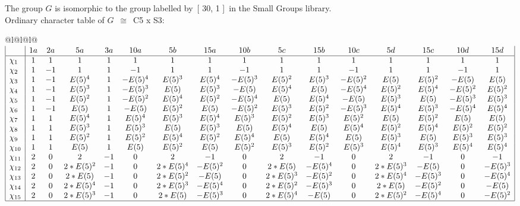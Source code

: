 \documentclass[varwidth=\maxdimen,border=10]{standalone}
\begin{document}
The group $G$ is isomorphic to the group labelled by\ [ 30, 1 ]\ in the Small Groups library.\\
Ordinary character table of $G$\ $\cong$\ C5 x S3:\\
\begin{center}
\begin{tabular}{@{}l@{}l@{}l@{}}
\hline
\(\begin{array}{|l|ccccccccccccccc|}
  & 1a & 2a & 5a & 3a & 10a & 5b & 15a & 10b & 5c & 15b & 10c & 5d & 15c & 10d & 15d\\ \hline
\chi_{1} & 1 & 1 & 1 & 1 & 1 & 1 & 1 & 1 & 1 & 1 & 1 & 1 & 1 & 1 & 1\\
\chi_{2} & 1 & -1 & 1 & 1 & -1 & 1 & 1 & -1 & 1 & 1 & -1 & 1 & 1 & -1 & 1\\
\chi_{3} & 1 & -1 & E(5)^{4} & 1 & -E(5)^{4} & E(5)^{3} & E(5)^{4} & -E(5)^{3} & E(5)^{2} & E(5)^{3} & -E(5)^{2} & E(5) & E(5)^{2} & -E(5) & E(5)\\
\chi_{4} & 1 & -1 & E(5)^{3} & 1 & -E(5)^{3} & E(5) & E(5)^{3} & -E(5) & E(5)^{4} & E(5) & -E(5)^{4} & E(5)^{2} & E(5)^{4} & -E(5)^{2} & E(5)^{2}\\
\chi_{5} & 1 & -1 & E(5)^{2} & 1 & -E(5)^{2} & E(5)^{4} & E(5)^{2} & -E(5)^{4} & E(5) & E(5)^{4} & -E(5) & E(5)^{3} & E(5) & -E(5)^{3} & E(5)^{3}\\
\chi_{6} & 1 & -1 & E(5) & 1 & -E(5) & E(5)^{2} & E(5) & -E(5)^{2} & E(5)^{3} & E(5)^{2} & -E(5)^{3} & E(5)^{4} & E(5)^{3} & -E(5)^{4} & E(5)^{4}\\
\chi_{7} & 1 & 1 & E(5)^{4} & 1 & E(5)^{4} & E(5)^{3} & E(5)^{4} & E(5)^{3} & E(5)^{2} & E(5)^{3} & E(5)^{2} & E(5) & E(5)^{2} & E(5) & E(5)\\
\chi_{8} & 1 & 1 & E(5)^{3} & 1 & E(5)^{3} & E(5) & E(5)^{3} & E(5) & E(5)^{4} & E(5) & E(5)^{4} & E(5)^{2} & E(5)^{4} & E(5)^{2} & E(5)^{2}\\
\chi_{9} & 1 & 1 & E(5)^{2} & 1 & E(5)^{2} & E(5)^{4} & E(5)^{2} & E(5)^{4} & E(5) & E(5)^{4} & E(5) & E(5)^{3} & E(5) & E(5)^{3} & E(5)^{3}\\
\chi_{10} & 1 & 1 & E(5) & 1 & E(5) & E(5)^{2} & E(5) & E(5)^{2} & E(5)^{3} & E(5)^{2} & E(5)^{3} & E(5)^{4} & E(5)^{3} & E(5)^{4} & E(5)^{4}\\
\chi_{11} & 2 & 0 & 2 & -1 & 0 & 2 & -1 & 0 & 2 & -1 & 0 & 2 & -1 & 0 & -1\\
\chi_{12} & 2 & 0 & 2*E(5)^{2} & -1 & 0 & 2*E(5)^{4} & -E(5)^{2} & 0 & 2*E(5) & -E(5)^{4} & 0 & 2*E(5)^{3} & -E(5) & 0 & -E(5)^{3}\\
\chi_{13} & 2 & 0 & 2*E(5) & -1 & 0 & 2*E(5)^{2} & -E(5) & 0 & 2*E(5)^{3} & -E(5)^{2} & 0 & 2*E(5)^{4} & -E(5)^{3} & 0 & -E(5)^{4}\\
\chi_{14} & 2 & 0 & 2*E(5)^{4} & -1 & 0 & 2*E(5)^{3} & -E(5)^{4} & 0 & 2*E(5)^{2} & -E(5)^{3} & 0 & 2*E(5) & -E(5)^{2} & 0 & -E(5)\\
\chi_{15} & 2 & 0 & 2*E(5)^{3} & -1 & 0 & 2*E(5) & -E(5)^{3} & 0 & 2*E(5)^{4} & -E(5) & 0 & 2*E(5)^{2} & -E(5)^{4} & 0 & -E(5)^{2}\\
\hline
\end{array}\)\\
\end{tabular}
\end{center}
\end{document}
